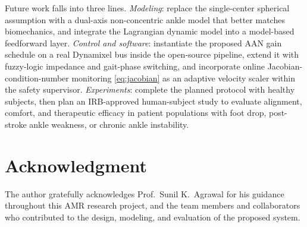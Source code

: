 \documentclass[conference]{IEEEtran}
\begin{document}
Future work falls into three lines. \emph{Modeling}: replace the single-center spherical assumption with a dual-axis non-concentric ankle model that better matches biomechanics, and integrate the Lagrangian dynamic model into a model-based feedforward layer. \emph{Control and software}: instantiate the proposed AAN gain schedule on a real Dynamixel bus inside the open-source pipeline, extend it with fuzzy-logic impedance and gait-phase switching, and incorporate online Jacobian-condition-number monitoring \eqref{eq:jacobian} as an adaptive velocity scaler within the safety supervisor. \emph{Experiments}: complete the planned protocol with healthy subjects, then plan an IRB-approved human-subject study to evaluate alignment, comfort, and therapeutic efficacy in patient populations with foot drop, post-stroke ankle weakness, or chronic ankle instability.

\section*{Acknowledgment}

The author gratefully acknowledges Prof.\ Sunil K.\ Agrawal for his guidance throughout this AMR research project, and the team members and collaborators who contributed to the design, modeling, and evaluation of the proposed system.
\end{document}
